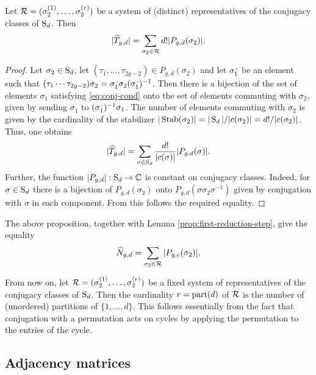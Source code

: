 \begin{prop}
 Let $\mathcal{R}=(\sigma_2^{(1)},\dotsc,\sigma_2^{(r)})$ be a system of (distinct) representatives of the conjugacy classes of $\operatorname{S}_d$. Then \[|\widehat{T}_{g,d}|=\sum_{\sigma_2\in\mathcal{R}}d!|P_{g,d}(\sigma_2)|.\]
\end{prop}
\begin{proof}
 Let $\sigma_2 \in \operatorname{S}_d$, let $(\tau_1,\dotsc,\tau_{2g-2}) \in P_{g,d}(\sigma_2)$ and let $\sigma^\textrm{\,,}_1$ be an element such that $(\tau_1 \dotsm \tau_{2g-2})\sigma_2=\sigma^\textrm{\,,}_1\sigma_2(\sigma^\textrm{\,,}_1)^{-1}$. Then there is a bijection of the set of elements $\sigma_1$ satisfying \eqref{eq:conj-cond} onto the set of elements commuting with $\sigma_2$, given by sending $\sigma_1$ to $(\sigma^\textrm{\,,}_1)^{-1}\sigma_1$. The number of elements commuting with $\sigma_2$ is given by the cardinality of the stabilizer $|\operatorname{Stab}(\sigma_2)|=|\operatorname{S}_d|/|c(\sigma_2)|=d!/|c(\sigma_2)|$. Thus, one obtains 
 \[
  |\widehat{T}_{g,d}|=\sum_{\sigma\in\operatorname{S}_d}\frac{d!}{|c(\sigma)|}|P_{g,d}(\sigma)|.
 \]
Further, the function $|P_{g,d}|:\operatorname{S}_d\to\mathbb{C}$ is constant on conjugacy classes. Indeed, for $\sigma\in\operatorname{S}_d$ there is a bijection of $P_{g,d}(\sigma_2)$ onto $P_{g,d}(\sigma\sigma_2\sigma^{-1})$ given by conjugation with $\sigma$ in each component. From this follows the required equality.
\end{proof}

\begin{cor} \label{prop:first-second-reduction-step}
 The above proposition, together with Lemma \ref{prop:first-reduction-step}, give the equality
 \[
  \widehat{N}_{g,d}=\sum_{\sigma_2\in\mathcal{R}}|P_{g,c}(\sigma_2)|.
 \]
\end{cor}

From now on, let $\mathcal{R}=(\sigma_2^{(1)},\dotsc,\sigma_2^{(r)})$ be a fixed system of representatives of the conjugacy classes of $\operatorname{S}_d$. Then the cardinality $r=\operatorname{part}(d)$ of $\mathcal{R}$ is the number of (unordered) partitions of $\{1,\dotsc,d\}$. This follows essentially from the fact that conjugation with a permutation acts on cycles by applying the permutation to the entries of the cycle.

\subsection{Adjacency matrices}

